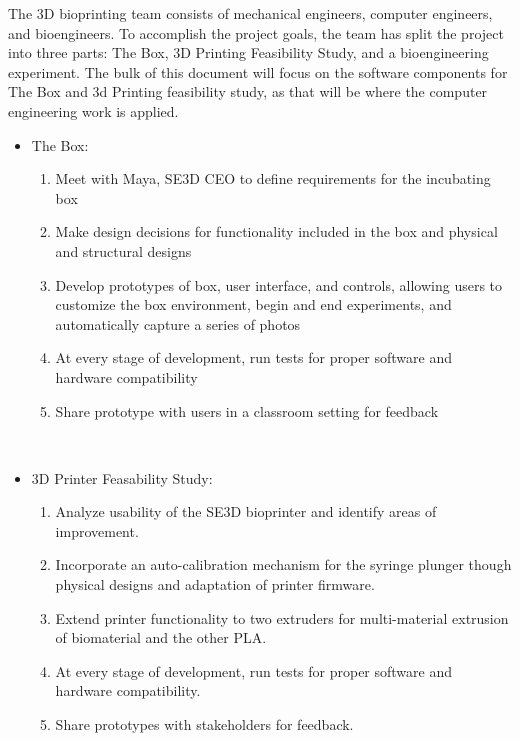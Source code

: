 The 3D bioprinting team consists of mechanical engineers, computer engineers, and bioengineers. To accomplish the project goals, the team has split the project into three parts: The Box, 3D Printing Feasibility Study, and a bioengineering experiment. The bulk of this document will focus on the software components for The Box and 3d Printing feasibility study, as that will be where the computer engineering work is applied.
\begin{itemize}
	\item  The Box:
	\begin{enumerate}
		\item Meet with Maya, SE3D CEO to define requirements for the incubating box
		\item Make design decisions for functionality included in the box and physical and structural designs
		\item Develop prototypes of box, user interface, and controls, allowing users to customize the box environment, begin and end experiments, and automatically capture a series of photos
		\item At every stage of development, run tests for proper software and hardware compatibility
		\item Share prototype with users in a classroom setting for feedback
	\end{enumerate}
	\\
	\item 3D Printer Feasability Study:
	\begin{enumerate}
		\item Analyze usability of the SE3D bioprinter and identify areas of improvement.

		\item Incorporate an auto-calibration mechanism for the syringe plunger though physical designs and adaptation of printer firmware.

		\item Extend printer functionality to two extruders for multi-material extrusion of biomaterial and the other PLA.

		\item At every stage of development, run tests for proper software and hardware compatibility.

		\item Share prototypes with stakeholders for feedback.
	\end{enumerate}
\end{itemize}